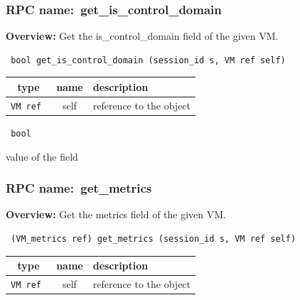 \subsubsection{RPC name:~get\_is\_control\_domain}

{\bf Overview:} 
Get the is\_control\_domain field of the given VM.

\begin{verbatim} bool get_is_control_domain (session_id s, VM ref self)\end{verbatim}



 
\vspace{0.3cm}
\begin{tabular}{|c|c|p{7cm}|}
 \hline
{\bf type} & {\bf name} & {\bf description} \\ \hline
{\tt VM ref } & self & reference to the object \\ \hline 

\end{tabular}

\vspace{0.3cm}

{\tt 
bool
}


value of the field
\vspace{0.3cm}
\vspace{0.3cm}
\vspace{0.3cm}
\subsubsection{RPC name:~get\_metrics}

{\bf Overview:} 
Get the metrics field of the given VM.

\begin{verbatim} (VM_metrics ref) get_metrics (session_id s, VM ref self)\end{verbatim}



 
\vspace{0.3cm}
\begin{tabular}{|c|c|p{7cm}|}
 \hline
{\bf type} & {\bf name} & {\bf description} \\ \hline
{\tt VM ref } & self & reference to the object \\ \hline 

\end{tabular}


